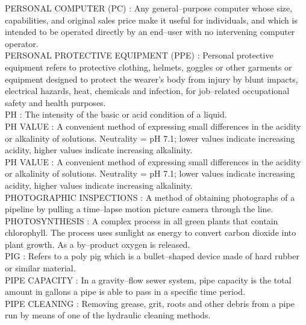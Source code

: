 PERSONAL COMPUTER (PC) :   Any general–purpose computer whose size, capabilities, and original sales price make it useful for individuals, and which is intended to be operated directly by an end–user with no intervening computer operator.\\
\vspace{0.15cm}
PERSONAL PROTECTIVE EQUIPMENT (PPE) :   Personal protective equipment refers to protective clothing, helmets, goggles or other garments or equipment designed to protect the wearer’s body from injury by blunt impacts, electrical hazards, heat, chemicals and infection, for job–related occupational safety and health purposes.\\
\vspace{0.15cm}
PH :  The intensity of the basic or acid condition of a liquid.\\
\vspace{0.15cm}
PH VALUE :   A convenient method of expressing small differences in the acidity or alkalinity of solutions. Neutrality = pH 7.1; lower values indicate increasing acidity, higher values indicate increasing alkalinity.\\
\vspace{0.15cm}
PH VALUE :   A convenient method of expressing small differences in the acidity or alkalinity of solutions. Neutrality = pH 7.1; lower values indicate increasing acidity, higher values indicate increasing alkalinity.\\
\vspace{0.15cm}
PHOTOGRAPHIC INSPECTIONS :  A method of obtaining photographs of a pipeline by pulling a time–lapse motion picture camera through the line. \\
\vspace{0.15cm}
PHOTOSYNTHESIS :  A complex process in all green plants that contain chlorophyll. The process uses sunlight as energy to convert carbon dioxide into plant growth. As a by–product oxygen is released.\\
\vspace{0.15cm}
PIG :  Refers to a poly pig which is a bullet–shaped device made of hard rubber or similar material. \\
\vspace{0.15cm}
PIPE CAPACITY :  In a gravity–flow sewer system, pipe capacity is the total amount in gallons a pipe is able to pass in a specific time period. \\
\vspace{0.15cm}
PIPE CLEANING :  Removing grease, grit, roots and other debris from a pipe run by means of one of the hydraulic cleaning methods. \\
